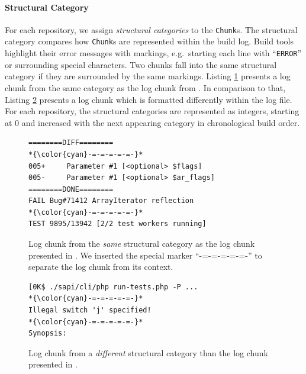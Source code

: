 \documentclass[sigconf]{acmart}
\begin{document}
\paragraph{Structural Category}
For each repository, we assign \emph{structural categories} to the \texttt{Chunk}s.
The structural category compares how \texttt{Chunk}s are represented within the build log.
Build tools highlight their error messages with markings, e.g.\ starting each line with ``\texttt{ERROR}'' or surrounding special characters.
Two chunks fall into the same structural category if they are surrounded by the same markings.
Listing \ref{lst:same-category} presents a log chunk from the same category as the log chunk from .
In comparison to that, Listing \ref{lst:different-category} presents a log chunk which is formatted differently within the log file.
For each repository, the structural categories are represented as integers, starting at 0 and increased with the next appearing category in chronological build order.

\begin{figure}[tbp]
	\centering
\begin{lstlisting}[breaklines=true]
========DIFF========
*{\color{cyan}-=-=-=-=-=-}*
005+     Parameter #1 [<optional> $flags]
005-     Parameter #1 [<optional> $ar_flags]
========DONE========
FAIL Bug#71412 ArrayIterator reflection 
*{\color{cyan}-=-=-=-=-=-}*
TEST 9895/13942 [2/2 test workers running]
\end{lstlisting}
\vspace{-0.3cm}
	\caption{Log chunk from the \emph{same} structural category as the log chunk presented in . We inserted the special marker ``{\color{cyan}-=-=-=-=-=-}'' to separate the log chunk from its context.}
	\label{lst:same-category}
\end{figure}

\begin{figure}[tbp]
	\centering
\begin{lstlisting}[breaklines=true]
[0K$ ./sapi/cli/php run-tests.php -P ...
*{\color{cyan}-=-=-=-=-=-}*
Illegal switch 'j' specified!
*{\color{cyan}-=-=-=-=-=-}*
Synopsis:
\end{lstlisting}
\vspace{-0.3cm}
	\caption{Log chunk from a \emph{different} structural category than the log chunk presented in .}
	\label{lst:different-category}
        \vspace{-0.3cm}
\end{figure}
\end{document}
